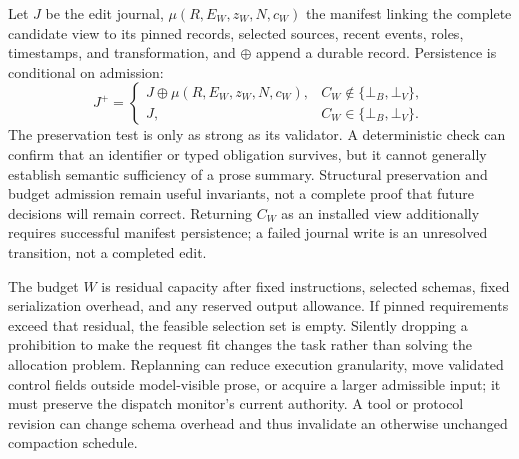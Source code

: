 Let $J$ be the edit journal, $\mu(R,E_W,z_W,N,c_W)$ the manifest linking the complete candidate view to its pinned records, selected sources, recent events, roles, timestamps, and transformation, and $\oplus$ append a durable record. Persistence is conditional on admission:
\begin{equation}
 J^+=
 \begin{cases}
 J\oplus\mu(R,E_W,z_W,N,c_W),&C_W\notin\{\bot_B,\bot_V\},\\
 J,&C_W\in\{\bot_B,\bot_V\}.
 \end{cases}
\label{eq:C12:context-manifest}
\end{equation}
The preservation test is only as strong as its validator. A deterministic check can confirm that an identifier or typed obligation survives, but it cannot generally establish semantic sufficiency of a prose summary. Structural preservation and budget admission remain useful invariants, not a complete proof that future decisions will remain correct. Returning $C_W$ as an installed view additionally requires successful manifest persistence; a failed journal write is an unresolved transition, not a completed edit.

The budget $W$ is residual capacity after fixed instructions, selected schemas, fixed serialization overhead, and any reserved output allowance. If pinned requirements exceed that residual, the feasible selection set is empty. Silently dropping a prohibition to make the request fit changes the task rather than solving the allocation problem. Replanning can reduce execution granularity, move validated control fields outside model-visible prose, or acquire a larger admissible input; it must preserve the dispatch monitor's current authority. A tool or protocol revision can change schema overhead and thus invalidate an otherwise unchanged compaction schedule.

